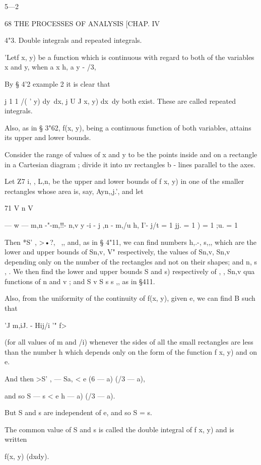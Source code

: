 5—2



68 THE PROCESSES OF ANALYSIS [CHAP. IV

4"3. Double integrals and repeated integrals.

'Letf x, y) be a function which is continuous with regard to both of
the variables x and y, when a x h, a y - /3,

By § 4'2 example 2 it is clear that

j 1 1 /( ' y) dy\ dx, j U J x, y) dx\ dy both exist. These are called
repeated integrals.



Also, as in § 3"62, f(x, y), being a continuous function of both
variables, attains its upper and lower bounds.

Consider the range of values of x and y to be the points inside and on
a rectangle in a Cartesian diagram ; divide it into nv rectangles b -
lines parallel to the axes.

Let Z7 i, , L,n, be the upper and lower bounds of f x, y) in one of
the smaller rectangles whose area is, say, Ayn,,j.', and let

71 V n V

— w — m,n -"-m,!!- n,v y -i - j ,n - m,/u h, I'- j/t = 1 jj. = 1 ) = 1
;u. = 1

Then *S' , >•?, \ ,, and, as in § 4"11, we can find numbers h,.-, s,,,
which are the lower and upper bounds of Sn,v, V" respectively, the
values of Sn,v, Sn,v depending only on the number of the rectangles
and not on their shapes; and n, s , . We then find the lower and upper
bounds S and s) respectively of , , Sn,v qua functions of n and v ;
and S v S s s ,, as in §411.

Also, from the uniformity of the continuity of f(x, y), given e, we
can find B such that

'J m,iJ. - Hij/i '" f>

(for all values of m and /i) whenever the sides of all the small
rectangles are less than the number h which depends only on the form
of the function f x, y) and on e.

And then >S' , — Sa, < e (6 — a) (/3 — a),

and so S — s < e h — a) (/3 — a).

But S and s are independent of e, and so S = s.

The common value of S and s is called the double integral of f x, y)
and is written

f(x, y) (dxdy).



